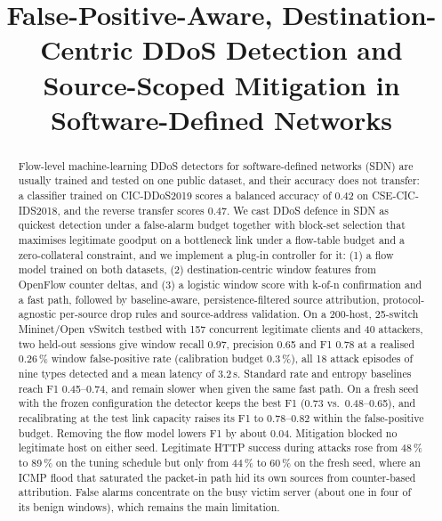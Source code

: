 \documentclass[conference]{IEEEtran}
\begin{document}
\title{False-Positive-Aware, Destination-Centric DDoS Detection and Source-Scoped Mitigation in Software-Defined Networks}

\author{
\and
{}
\and
{}
\and
{}
\and
{}
}

\maketitle

\begin{abstract}
Flow-level machine-learning DDoS detectors for software-defined networks (SDN) are usually trained and tested on one public dataset, and their accuracy does not transfer: a classifier trained on CIC-DDoS2019 scores a balanced accuracy of 0.42 on CSE-CIC-IDS2018, and the reverse transfer scores 0.47. We cast DDoS defence in SDN as quickest detection under a false-alarm budget together with block-set selection that maximises legitimate goodput on a bottleneck link under a flow-table budget and a zero-collateral constraint, and we implement a plug-in controller for it: (1) a flow model trained on both datasets, (2) destination-centric window features from OpenFlow counter deltas, and (3) a logistic window score with k-of-n confirmation and a fast path, followed by baseline-aware, persistence-filtered source attribution, protocol-agnostic per-source drop rules and source-address validation. On a 200-host, 25-switch Mininet/Open vSwitch testbed with 157 concurrent legitimate clients and 40 attackers, two held-out sessions give window recall 0.97, precision 0.65 and F1 0.78 at a realised 0.26\,\% window false-positive rate (calibration budget 0.3\,\%), all 18 attack episodes of nine types detected and a mean latency of 3.2\,s. Standard rate and entropy baselines reach F1 0.45--0.74, and remain slower when given the same fast path. On a fresh seed with the frozen configuration the detector keeps the best F1 (0.73 vs.\ 0.48--0.65), and recalibrating at the test link capacity raises its F1 to 0.78--0.82 within the false-positive budget. Removing the flow model lowers F1 by about 0.04. Mitigation blocked no legitimate host on either seed. Legitimate HTTP success during attacks rose from 48\,\% to 89\,\% on the tuning schedule but only from 44\,\% to 60\,\% on the fresh seed, where an ICMP flood that saturated the packet-in path hid its own sources from counter-based attribution. False alarms concentrate on the busy victim server (about one in four of its benign windows), which remains the main limitation.
\end{abstract}
\end{document}
